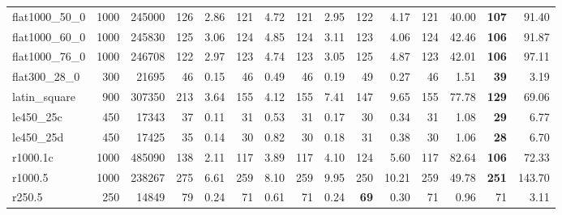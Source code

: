 \begin{table*}[tbh]
\begin{adjustbox}{width=\textwidth}
\begin{minipage}[b]{\textwidth}
\begin{tabular}{@{} lrrrrrrrrrrrrrr @{}}
flat1000\_50\_0 & 1000 & 245000 & 126 & 2.86 & 121 & 4.72 & 121 & 2.95 & 122 & 4.17 & 121 & 40.00 & \textbf{107} & 91.40 \\
flat1000\_60\_0 & 1000 & 245830 & 125 & 3.06 & 124 & 4.85 & 124 & 3.11 & 123 & 4.06 & 124 & 42.46 & \textbf{106} & 91.87 \\
flat1000\_76\_0 & 1000 & 246708 & 122 & 2.97 & 123 & 4.74 & 123 & 3.05 & 125 & 4.87 & 123 & 42.01 & \textbf{106} & 97.11 \\
flat300\_28\_0 & 300 & 21695 & 46 & 0.15 & 46 & 0.49 & 46 & 0.19 & 49 & 0.27 & 46 & 1.51 & \textbf{39} & 3.19 \\
latin\_square & 900 & 307350 & 213 & 3.64 & 155 & 4.12 & 155 & 7.41 & 147 & 9.65 & 155 & 77.78 & \textbf{129} & 69.06 \\
le450\_25c & 450 & 17343 & 37 & 0.11 & 31 & 0.53 & 31 & 0.17 & 30 & 0.34 & 31 & 1.08 & \textbf{29} & 6.77 \\
le450\_25d & 450 & 17425 & 35 & 0.14 & 30 & 0.82 & 30 & 0.18 & 31 & 0.38 & 30 & 1.06 & \textbf{28} & 6.70 \\
r1000.1c & 1000 & 485090 & 138 & 2.11 & 117 & 3.89 & 117 & 4.10 & 124 & 5.60 & 117 & 82.64 & \textbf{106} & 72.33 \\
r1000.5 & 1000 & 238267 & 275 & 6.61 & 259 & 8.10 & 259 & 9.95 & 250 & 10.21 & 259 & 49.78 & \textbf{251} & 143.70 \\
r250.5 & 250 & 14849 & 79 & 0.24 & 71 & 0.61 & 71 & 0.24 & \textbf{69} & 0.30 & 71 & 0.96 & 71 & 3.11 \\
\bottomrule
\end{tabular}
\end{minipage}
\end{adjustbox}
\end{table*}